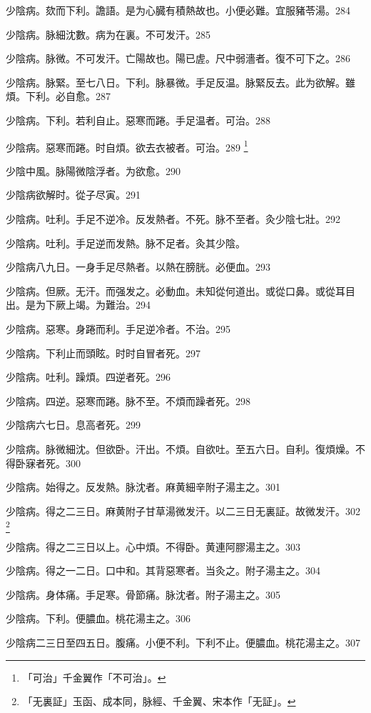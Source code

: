 少陰病。欬而下利。譫語。是为心臓有積熱故也。小便必難。宜服豬苓湯。{\gaoben}284

少陰病。脉細沈數。病为在裏。不可发汗。285

少陰病。脉微。不可发汗。亡陽故也。陽已虗。尺中弱濇者。復不可下之。286

少陰病。脉緊。至七八日。下利。脉暴微。手足反温。脉緊反去。此为欲解。雖煩。下利。必自愈。287

少陰病。下利。若利自止。惡寒而踡。手足温者。可治。288

少陰病。惡寒而踡。时自煩。欲去衣被者。可治。289
	\footnote{「可治」千金翼作「不可治」。}

少陰中風。脉陽微陰浮者。为欲愈。290

少陰病欲解时。從子尽寅。291

少陰病。吐利。手足不逆{\khaaitp 冷}。反发熱者。不死。脉不至者。灸少陰七壯。292

少陰病。吐利。手足逆而发熱。脉不足者。灸其少陰。{\gaoben}

少陰病八九日。一身手足尽熱者。以熱在膀胱。必便血。293

少陰病。但厥。无汗。而强发之。必動血。未知從何道出。或從口鼻。或從{\khaaitp 耳}目出。是为下厥上竭。为難治。294

少陰病。惡寒。身踡而利。手足逆{\khaaitp 冷}者。不治。295

少陰病。下利止而頭眩。时时自冒者死。297

少陰病。吐利。躁煩。四逆者死。296

少陰病。四逆。惡寒而踡。脉不至。不煩而躁者死。298

少陰病六七日。息高者死。299

少陰病。脉微細沈。但欲卧。汗出。不煩。自欲吐。{\khaaitp 至}五六日。自利。復煩燥。不得卧寐者死。300

少陰病。始得之。反发熱。脉沈者。麻黄細辛附子湯主之。301

少陰病。得之二三日。麻黄附子甘草湯微发汗。以二三日无{\khaaitp 裏}証。故微发汗。302
	\footnote{「无裏証」玉函、成本同，脉經、千金翼、宋本作「无証」。}

少陰病。得之二三日以上。心中煩。不得卧。黄連阿膠湯主之。303

少陰病。得之一二日。口中和。其背惡寒者。当灸之。附子湯主之。304

少陰病。身体痛。手足寒。骨節痛。脉沈者。附子湯主之。305

少陰病。下利。便膿血。桃花湯主之。306

少陰病二三日至四五日。腹痛。小便不利。下利不止。便膿血。桃花湯主之。307

